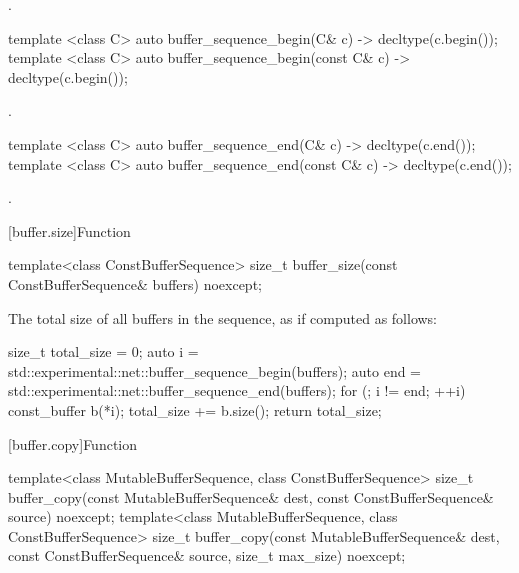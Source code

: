 \begin{itemdescr}
\pnum
\returns {}.
\end{itemdescr}

\begin{itemdecl}
template <class C> auto buffer_sequence_begin(C& c) -> decltype(c.begin());
template <class C> auto buffer_sequence_begin(const C& c) -> decltype(c.begin());
\end{itemdecl}

\begin{itemdescr}
\pnum
\returns {}.
\end{itemdescr}

\begin{itemdecl}
template <class C> auto buffer_sequence_end(C& c) -> decltype(c.end());
template <class C> auto buffer_sequence_end(const C& c) -> decltype(c.end());
\end{itemdecl}

\begin{itemdescr}
\pnum
\returns {}.
\end{itemdescr}



[buffer.size]{Function }

\begin{itemdecl}
template<class ConstBufferSequence>
  size_t buffer_size(const ConstBufferSequence& buffers) noexcept;
\end{itemdecl}

\begin{itemdescr}
\pnum
\returns The total size of all buffers in the sequence, as if computed as follows:
\begin{codeblock}
size_t total_size = 0;
auto i = std::experimental::net::buffer_sequence_begin(buffers);
auto end = std::experimental::net::buffer_sequence_end(buffers);
for (; i != end; ++i)
{
  const_buffer b(*i);
  total_size += b.size();
}
return total_size;
\end{codeblock}

\end{itemdescr}



[buffer.copy]{Function }

\begin{itemdecl}
template<class MutableBufferSequence, class ConstBufferSequence>
  size_t buffer_copy(const MutableBufferSequence& dest,
                     const ConstBufferSequence& source) noexcept;
template<class MutableBufferSequence, class ConstBufferSequence>
  size_t buffer_copy(const MutableBufferSequence& dest,
                     const ConstBufferSequence& source,
                     size_t max_size) noexcept;
\end{itemdecl}

